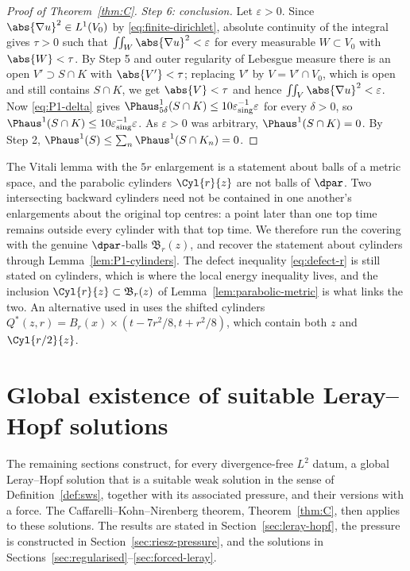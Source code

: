 \documentclass[11pt,reqno]{amsart}
\begin{document}
\begin{proof}[Proof of Theorem~\ref{thm:C}]
\emph{Step 6: conclusion.} Let $\varepsilon>0$. Since
$\abs{\nabla u}^{2}\in L^{1}(V_{0})$ by \eqref{eq:finite-dirichlet}, absolute
continuity of the integral gives $\tau>0$ such that
$\iint_{W}\abs{\nabla u}^{2}<\varepsilon$ for every measurable $W\subset V_{0}$
with $\abs{W}<\tau$. By Step 5 and outer regularity of Lebesgue measure there is
an open $V'\supset S\cap K$ with $\abs{V'}<\tau$; replacing $V'$ by
$V=V'\cap V_{0}$, which is open and still contains $S\cap K$, we get
$\abs{V}<\tau$ and hence $\iint_{V}\abs{\nabla u}^{2}<\varepsilon$. Now
\eqref{eq:P1-delta} gives $\Phaus^{1}_{5\delta}(S\cap K)\le10\varepsilon_{\mathrm{sing}}^{-1}\varepsilon$
for every $\delta>0$, so $\Phaus^{1}(S\cap K)\le10\varepsilon_{\mathrm{sing}}^{-1}\varepsilon$.
As $\varepsilon>0$ was arbitrary, $\Phaus^{1}(S\cap K)=0$. By Step 2,
$\Phaus^{1}(S)\le\sum_{n}\Phaus^{1}(S\cap K_{n})=0$.
\end{proof}

\begin{remark}
\label{rem:balls-vs-cylinders}
The Vitali lemma with the $5r$ enlargement is a statement about balls of a
metric space, and the parabolic cylinders $\Cyl{r}{z}$ are not balls of
$\dpar$. Two intersecting backward cylinders need not be contained in
one another's enlargements about the original top centres: a point later
than one top time remains outside every cylinder with that top time.
We therefore run the covering with the genuine $\dpar$-balls
$\mathfrak{B}_{r}(z)$, and recover the statement about cylinders through
Lemma~\ref{lem:P1-cylinders}. The defect inequality \eqref{eq:defect-r} is still
stated on cylinders, which is where the local energy inequality lives, and the
inclusion $\Cyl{r}{z}\subset\mathfrak{B}_{r}(z)$ of
Lemma~\ref{lem:parabolic-metric} is what links the two. An alternative used in
\cite[\S6.2, pp.~96--97]{Tsai2018} uses the shifted cylinders
$Q^*(z,r)=B_r(x)\times(t-7r^2/8,t+r^2/8)$, which contain both $z$ and
$\Cyl{r/2}{z}$.
\end{remark}

\part*{Global existence of suitable Leray--Hopf solutions}

The remaining sections construct, for every divergence-free $L^2$ datum, a
global Leray--Hopf solution that is a suitable weak solution in the sense of
Definition~\ref{def:sws}, together with its associated pressure, and their
versions with a force. The Caffarelli--Kohn--Nirenberg theorem,
Theorem~\ref{thm:C}, then applies to these solutions. The results are stated
in Section~\ref{sec:leray-hopf}, the pressure is constructed in
Section~\ref{sec:riesz-pressure}, and the solutions in
Sections~\ref{sec:regularised}--\ref{sec:forced-leray}.
\end{document}
